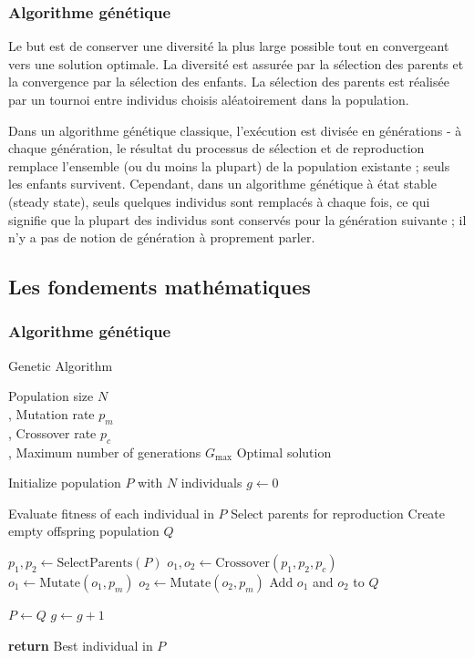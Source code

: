 \documentclass[journal, a4paper]{IEEEtran}
\begin{document}
	\subsubsection{Algorithme génétique}

	Le but est de conserver une diversité la plus large possible
	tout en convergeant vers une solution optimale.
	La diversité est assurée par la sélection des parents
	et la convergence par la sélection des enfants.
	La sélection des parents est réalisée par un tournoi
	entre individus choisis aléatoirement dans la population.

	Dans un algorithme génétique classique,
	l'exécution est divisée en générations -
	à chaque génération, le résultat du processus de sélection
	et de reproduction remplace l'ensemble (ou du moins la plupart)
	de la population existante ; seuls les enfants survivent.
	Cependant, dans un algorithme génétique à état stable (steady state),
	seuls quelques individus sont remplacés à chaque fois,
	ce qui signifie que la plupart des individus sont conservés pour
	la génération suivante ;
	il n'y a pas de notion de génération à proprement parler.




	\subsection{Les fondements mathématiques}\label{subsec:les-fondements-mathematiques}

	\subsubsection{Algorithme génétique}
	\begin{algorithm}
		  \caption{Genetic Algorithm}\label{alg:ga}
		  \begin{algorithmic}
			\Require Population size $N$
			\\ , Mutation rate $p_m$
			\\ , Crossover rate $p_c$
			\\ , Maximum number of generations $G_{\max}$
			\Ensure Optimal solution

			\State Initialize population $P$ with $N$ individuals
			\State $g \gets 0$

			  \State Evaluate fitness of each individual in $P$
			  \State Select parents for reproduction
			  \State Create empty offspring population $Q$

				\State $p_1, p_2 \gets \text{SelectParents}(P)$
				\State $o_1, o_2 \gets \text{Crossover}(p_1, p_2, p_c)$
				\State $o_1 \gets \text{Mutate}(o_1, p_m)$
				\State $o_2 \gets \text{Mutate}(o_2, p_m)$
				\State Add $o_1$ and $o_2$ to $Q$
			  \EndWhile

			  \State $P \gets Q$
			  \State $g \gets g + 1$
			\EndWhile

			\State \textbf{return} Best individual in $P$
		  \end{algorithmic}
	\end{algorithm}
\end{document}

